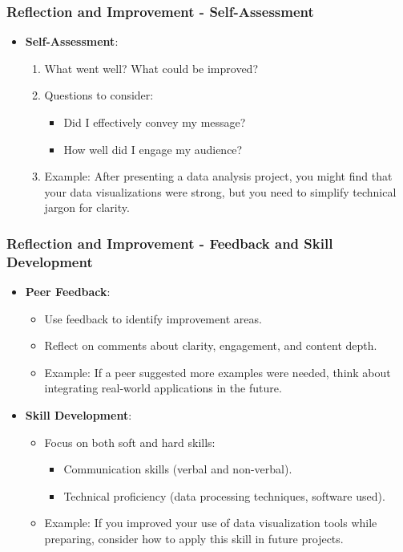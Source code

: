 \documentclass[aspectratio=169]{beamer}
\begin{document}
\begin{frame}[fragile]
    \frametitle{Reflection and Improvement - Self-Assessment}
    \begin{itemize}
        \item \textbf{Self-Assessment}:
        \begin{enumerate}
            \item What went well? What could be improved?
            \item Questions to consider:
                \begin{itemize}
                    \item Did I effectively convey my message?
                    \item How well did I engage my audience?
                \end{itemize}
            \item Example: After presenting a data analysis project, you might find that your data visualizations were strong, but you need to simplify technical jargon for clarity.
        \end{enumerate}
    \end{itemize}
\end{frame}

\begin{frame}[fragile]
    \frametitle{Reflection and Improvement - Feedback and Skill Development}
    \begin{itemize}
        \item \textbf{Peer Feedback}:
        \begin{itemize}
            \item Use feedback to identify improvement areas.
            \item Reflect on comments about clarity, engagement, and content depth.
            \item Example: If a peer suggested more examples were needed, think about integrating real-world applications in the future.
        \end{itemize}
        
        \item \textbf{Skill Development}:
        \begin{itemize}
            \item Focus on both soft and hard skills:
                \begin{itemize}
                    \item Communication skills (verbal and non-verbal).
                    \item Technical proficiency (data processing techniques, software used).
                \end{itemize}
            \item Example: If you improved your use of data visualization tools while preparing, consider how to apply this skill in future projects.
        \end{itemize}
    \end{itemize}
\end{frame}
\end{document}
